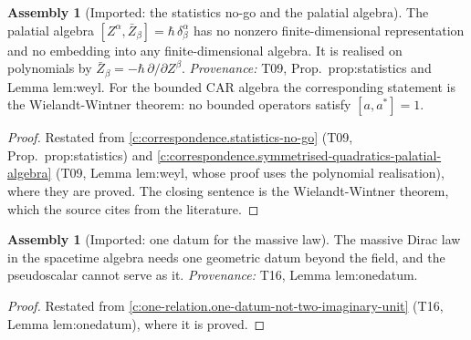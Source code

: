 \documentclass[11pt]{article}
\theoremstyle{definition}
\newtheorem{assembled}[theorem]{Assembly}
\theoremstyle{plain}
\begin{document}
\begin{assembled}[Imported: the statistics no-go and the palatial algebra]\label{c:field-theory.imported-statistics-no-go-palatial-algebra}
The palatial algebra $[Z^\alpha, \bar Z_\beta] = \hbar\,\delta^\alpha_\beta$ has no nonzero finite-dimensional representation and no embedding into any finite-dimensional algebra. It is realised on polynomials by $\bar Z_\beta = -\hbar\,\partial/\partial Z^\beta$. \emph{Provenance:} T09, Prop.~prop:statistics and Lemma lem:weyl. For the bounded CAR algebra the corresponding statement is the Wielandt-Wintner theorem: no bounded operators satisfy $[a, a^*] = 1$.
\end{assembled}
\begin{proof}
Restated from \ref{c:correspondence.statistics-no-go} (T09, Prop.~prop:statistics) and \ref{c:correspondence.symmetrised-quadratics-palatial-algebra} (T09, Lemma lem:weyl, whose proof uses the polynomial realisation), where they are proved. The closing sentence is the Wielandt-Wintner theorem, which the source cites from the literature.

\end{proof}

\begin{assembled}[Imported: one datum for the massive law]\label{c:field-theory.imported-one-datum-massive-law}
The massive Dirac law in the spacetime algebra needs one geometric datum beyond the field, and the pseudoscalar cannot serve as it. \emph{Provenance:} T16, Lemma lem:onedatum.
\end{assembled}
\begin{proof}
Restated from \ref{c:one-relation.one-datum-not-two-imaginary-unit} (T16, Lemma lem:onedatum), where it is proved.

\end{proof}
\end{document}
